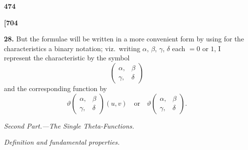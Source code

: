 \documentclass[11pt,a4paper]{book}
\begin{document}
\vspace{1em}

\begin{center}
\textbf{474}
\end{center}

\vspace{0.5em}

\noindent\textbf{[704}

\vspace{0.5em}

\noindent\textbf{28.}\quad
But the formulae will be written in a more convenient form by using for the characteristics a binary notation; viz.\ writing $\alpha$, $\beta$, $\gamma$, $\delta$ each $= 0$ or $1$, I represent the characteristic by the symbol
\[
\begin{pmatrix} \alpha, & \beta \\ \gamma, & \delta \end{pmatrix}
\]
and the corresponding function by
\[
\vartheta\begin{pmatrix} \alpha, & \beta \\ \gamma, & \delta \end{pmatrix}(u, v)\quad \text{or}\quad \vartheta\begin{pmatrix} \alpha, & \beta \\ \gamma, & \delta \end{pmatrix}.
\]

\vspace{1em}

\begin{center}
\textit{Second Part.---The Single Theta-Functions.}
\end{center}

\vspace{0.5em}

\begin{center}
\textit{Definition and fundamental properties.}
\end{center}

\vspace{0.5em}
\end{document}
